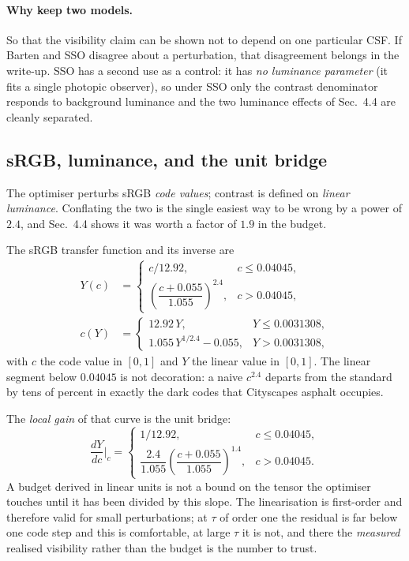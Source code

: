 \documentclass[11pt,a4paper]{article}
\begin{document}
\paragraph{Why keep two models.}
So that the visibility claim can be shown not to depend on one particular
CSF. If Barten and SSO disagree about a perturbation, that disagreement
belongs in the write-up. SSO has a second use as a control: it has \emph{no
luminance parameter} (it fits a single photopic observer), so under SSO only
the contrast denominator responds to background luminance and the two
luminance effects of Sec.~4.4 are cleanly separated.

\subsection{sRGB, luminance, and the unit bridge}

The optimiser perturbs sRGB \emph{code values}; contrast is defined on
\emph{linear luminance}. Conflating the two is the single easiest way to be
wrong by a power of $2.4$, and Sec.~4.4 shows it was worth a factor of
$1.9$ in the budget.

The sRGB transfer function and its inverse \citep{iec61966} are
\begin{align}
  Y(c) &= \begin{cases}
      c/12.92, & c\le0.04045,\\[2pt]
      \left(\dfrac{c+0.055}{1.055}\right)^{2.4}, & c>0.04045,
  \end{cases} \label{eq:srgb2lin}\\[4pt]
  c(Y) &= \begin{cases}
      12.92\,Y, & Y\le0.0031308,\\[2pt]
      1.055\,Y^{1/2.4}-0.055, & Y>0.0031308,
  \end{cases} \label{eq:lin2srgb}
\end{align}
with $c$ the code value in $[0,1]$ and $Y$ the linear value in $[0,1]$. The
linear segment below $0.04045$ is not decoration: a naive $c^{2.4}$ departs
from the standard by tens of percent in exactly the dark codes that
Cityscapes asphalt occupies.

The \emph{local gain} of that curve is the unit bridge:
\begin{equation}
  \frac{dY}{dc}\bigg|_{c} = \begin{cases}
      1/12.92, & c\le0.04045,\\[4pt]
      \dfrac{2.4}{1.055}\left(\dfrac{c+0.055}{1.055}\right)^{1.4},
        & c>0.04045.
  \end{cases}
  \label{eq:slope}
\end{equation}
A budget derived in linear units is not a bound on the tensor the optimiser
touches until it has been divided by this slope. The linearisation is
first-order and therefore valid for small perturbations; at $\tau$ of order
one the residual is far below one code step and this is comfortable, at
large $\tau$ it is not, and there the \emph{measured} realised visibility
rather than the budget is the number to trust.
\end{document}
